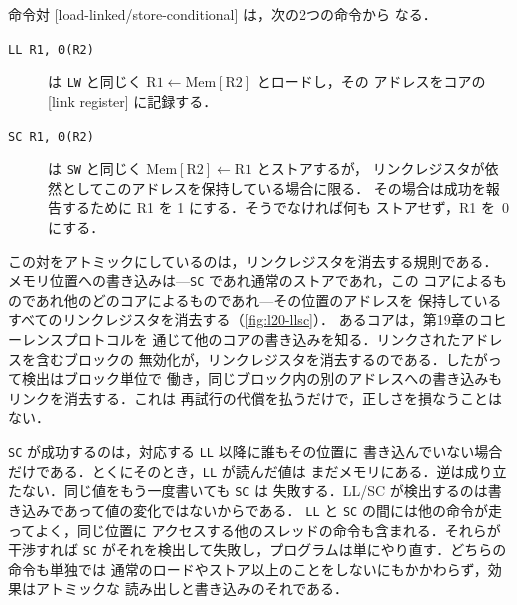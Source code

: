 \documentclass[../main.tex]{subfiles}
\begin{document}
\begin{definition}[LL/SC]
  命令対 [load-linked/store-conditional] は，次の2つの命令から
  なる．
  \begin{description}
    \item[\texttt{LL R1, 0(R2)}] は \texttt{LW} と同じく
      $\text{R1} \leftarrow \text{Mem}[\text{R2}]$ とロードし，その
      アドレスをコアの[link register]
      に記録する．
    \item[\texttt{SC R1, 0(R2)}] は \texttt{SW} と同じく
      $\text{Mem}[\text{R2}] \leftarrow \text{R1}$ とストアするが，
      リンクレジスタが依然としてこのアドレスを保持している場合に限る．
      その場合は成功を報告するために R1 を 1 にする．そうでなければ何も
      ストアせず，R1 を~0 にする．
  \end{description}
\end{definition}

この対をアトミックにしているのは，リンクレジスタを消去する規則である．
メモリ位置への書き込みは---\texttt{SC} であれ通常のストアであれ，この
コアによるものであれ他のどのコアによるものであれ---その位置のアドレスを
保持しているすべてのリンクレジスタを消去する（\cref{fig:l20-llsc}）．
あるコアは，第19章のコヒーレンスプロトコルを
通じて他のコアの書き込みを知る．リンクされたアドレスを含むブロックの
無効化が，リンクレジスタを消去するのである．したがって検出はブロック単位で
働き，同じブロック内の別のアドレスへの書き込みもリンクを消去する．これは
再試行の代償を払うだけで，正しさを損なうことはない．

\texttt{SC} が成功するのは，対応する \texttt{LL} 以降に誰もその位置に
書き込んでいない場合だけである．とくにそのとき，\texttt{LL} が読んだ値は
まだメモリにある．逆は成り立たない．同じ値をもう一度書いても \texttt{SC} は
失敗する．LL/SC が検出するのは書き込みであって値の変化ではないからである．
\texttt{LL} と \texttt{SC} の間には他の命令が走ってよく，同じ位置に
アクセスする他のスレッドの命令も含まれる．それらが干渉すれば \texttt{SC}
がそれを検出して失敗し，プログラムは単にやり直す．どちらの命令も単独では
通常のロードやストア以上のことをしないにもかかわらず，効果はアトミックな
読み出しと書き込みのそれである．
\end{document}
